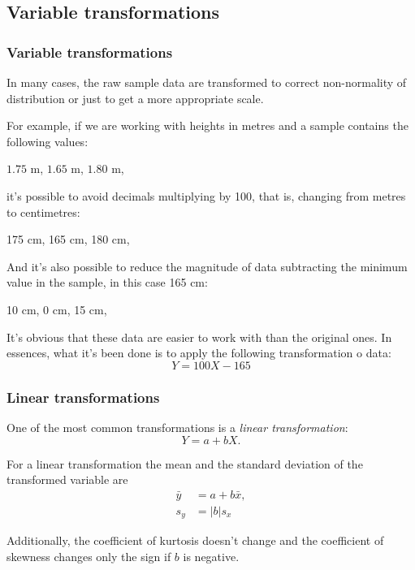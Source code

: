 \subsection{Variable transformations}

\begin{frame}
\frametitle{Variable transformations}
\small
In many cases, the raw sample data are transformed to correct non-normality of distribution or just to get a more
appropriate scale.

For example, if we are working with heights in metres and a sample contains the following values:
\begin{center}
$1.75$ m, $1.65$ m, $1.80$ m,
\end{center}
it's possible to avoid decimals multiplying by 100, that is, changing from metres to centimetres:
\begin{center}
175 cm, 165 cm, 180 cm,
\end{center}
And it's also possible to reduce the magnitude of data subtracting the minimum value in the sample, in this case 165 cm:
\begin{center}
10 cm, 0 cm, 15 cm,
\end{center}
It's obvious that these data are easier to work with than the original ones.
In essences, what it's been done is to apply the following transformation o data:
\[Y= 100X-165\]
\end{frame}


\begin{frame}
\frametitle{Linear transformations}
One of the most common transformations is a \emph{linear transformation}:
\[
Y=a+bX.
\]

For a linear transformation the mean and the standard deviation of the transformed variable are
\begin{align*}
\bar y &= a+ b\bar x,\\
s_{y} &= |b|s_{x}
\end{align*}

Additionally, the coefficient of kurtosis doesn't change and the coefficient of skewness changes only the sign if $b$ is
negative.
\end{frame}


